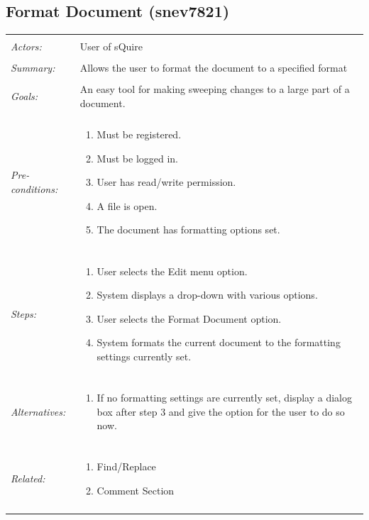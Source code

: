 \documentclass[11pt]{report}
\begin{document}
\subsection{Format Document  (snev7821)}
\begin{tabular}{ p{2cm} p{12cm} }
\hline \\
	\textit{Actors:} & User of sQuire \\
	\\
	\textit{Summary:} & Allows the user to format the document to a specified format \\
	\\
	\textit{Goals:} & An easy tool for making sweeping changes to a large part of a document. \\
	\\
	\textit{Pre-conditions:} & \begin{enumerate}
		\item Must be registered.
		\item Must be logged in.
		\item User has read/write permission.
		\item A file is open.
		\item The document has formatting options set.
	\end{enumerate} \\
	\\
	\textit{Steps:} & \begin{enumerate}
		\item User selects the Edit menu option.
		\item System displays a drop-down with various options.
		\item User selects the Format Document option.
		\item System formats the current document to the formatting settings currently set.
	\end{enumerate} \\
	\\
	\textit{Alternatives:} & \begin{enumerate}
		\item If no formatting settings are currently set, display a dialog box after step 3 and give the option for the user to do so now.
	\end{enumerate} \\
	\\
	\textit{Related:} & \begin{enumerate}
		\item Find/Replace
		\item Comment Section
	\end{enumerate} \\
	\\
\hline
\end{tabular}
\newpage
\end{document}

